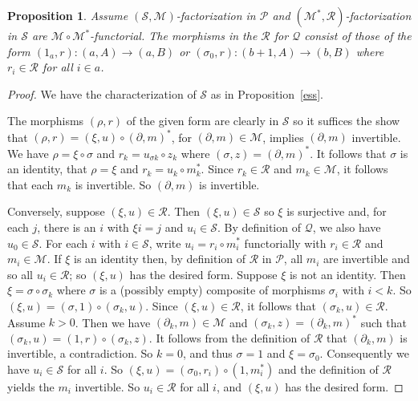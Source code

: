\documentclass[a4paper,12pt,reqno]{amsart}
\newtheorem{proposition}[theorem]{Proposition}
\theoremstyle{definition}
\theoremstyle{fact}
\theoremstyle{genquest}
\theoremstyle{step}
\newcommand{\ra}{\rightarrow}
\def\CM{{\mathscr M}}
\def\CP{{\mathscr P}}
\def\CQ{{\mathscr Q}}
\def\CR{{\mathscr R}}
\def\CS{{\mathscr S}}
\begin{document}
\begin{proposition}\label{ahr}
Assume $(\CS,\CM)$-factorization in $\CP$ and $(\CM^*,\CR)$-factorization 
in $\CS$ are $\CM\circ \CM^*$-functorial.
The morphisms in the $\CR$ for $\CQ$ consist of those of the form 
$(1_a,r) : (a,A)\ra (a,B)$ or $(\sigma_0,r):(b+1,A)\ra (b,B)$ where 
$r_i\in \CR$ for all $i\in a$.
\end{proposition}
\begin{proof}
We have the characterization of $\CS$ as in Proposition~\ref{ess}.

The morphisms $(\rho,r)$ of the given form are clearly in $\CS$ so
it suffices the show that $(\rho,r) = (\xi,u)\circ (\partial,m)^*$, for $(\partial,m)\in \CM$,
implies $(\partial,m)$ invertible. We have $\rho = \xi \circ \sigma$ and 
$r_k=u_{\sigma k}\circ z_k$ where $(\sigma,z)=(\partial,m)^*$.
It follows that $\sigma$ is an identity, that $\rho = \xi$ and $r_k=u_{k}\circ m^*_k$.
Since $r_k\in \CR$ and $m_k\in \CM$, it follows that each $m_k$ is invertible.
So $(\partial,m)$ is invertible. 

Conversely, suppose $(\xi,u)\in \CR$. Then $(\xi,u)\in \CS$ so $\xi$ is surjective
and, for each $j$, there is an $i$ with $\xi i = j$ and $u_i\in \CS$.
By definition of $\CQ$, we also have $u_0\in \CS$. 
For each $i$ with $i\in \CS$, write $u_i = r_i\circ m_i^*$ functorially 
with $r_i\in \CR$ and $m_i\in \CM$.
If $\xi$ is an identity then, by definition of $\CR$ in $\CP$, all $m_i$
are invertible and so all $u_i\in \CR$; so $(\xi,u)$ has the desired form.
Suppose $\xi$ is not an identity. Then $\xi = \sigma \circ \sigma_k$ where $\sigma$
is a (possibly empty) composite of morphisms $\sigma_i$ with $i<k$. So
$(\xi,u)= (\sigma, 1)\circ (\sigma_k, u)$. Since $(\xi,u)\in \CR$, it follows that
$(\sigma_k, u)\in \CR$. Assume $k>0$. Then we have $(\partial_k,m)\in \CM$ and 
$(\sigma_k,z)= (\partial_k,m)^*$ such that $(\sigma_k, u) = (1,r)\circ (\sigma_k,z)$.
It follows from the definition of $\CR$ that $(\partial_k,m)$ is invertible, a contradiction.
So $k = 0$, and thus $\sigma = 1$ and $\xi=\sigma_0$.
Consequently we have $u_i\in \CS$ for all $i$. 
So $(\xi,u)= (\sigma_0, r_i)\circ (1,m_i^*)$ and the definition of $\CR$ yields the $m_i$ invertible. 
So $u_i\in \CR$ for all $i$, and $(\xi,u)$ has the desired form.           
\end{proof}
\end{document}
